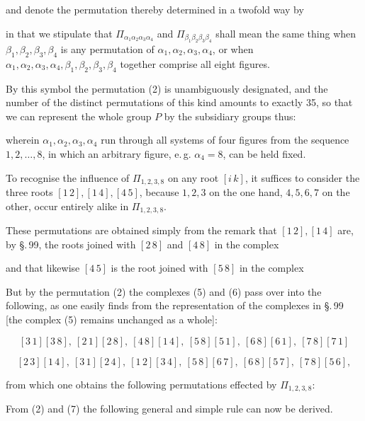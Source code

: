 and denote the permutation thereby determined in a twofold way by


in that we stipulate that $\Pi_{\alpha_1\alpha_2\alpha_3\alpha_4}$ and $\Pi_{\beta_1\beta_2\beta_3\beta_4}$ shall mean the same thing when $\beta_1,\beta_2,\beta_3,\beta_4$ is any permutation of $\alpha_1,\alpha_2,\alpha_3,\alpha_4$, or when $\alpha_1,\alpha_2,\alpha_3,\alpha_4,\beta_1,\beta_2,\beta_3,\beta_4$ together comprise all eight figures.

By this symbol the permutation (2) is unambiguously designated, and the number of the distinct permutations of this kind amounts to exactly 35, so that we can represent the whole group $P$ by the subsidiary groups thus:


wherein $\alpha_1,\alpha_2,\alpha_3,\alpha_4$ run through all systems of four figures from the sequence $1,2,\dots,8$, in which an arbitrary figure, e.\,g. $\alpha_4 = 8$, can be held fixed.

To recognise the influence of $\Pi_{1,2,3,8}$ on any root $[i\,k]$, it suffices to consider the three roots $[1\,2], [1\,4], [4\,5]$, because $1,2,3$ on the one hand, $4,5,6,7$ on the other, occur entirely alike in $\Pi_{1,2,3,8}$.

These permutations are obtained simply from the remark that $[1\,2], [1\,4]$ are, by \S.\,99, the roots joined with $[2\,8]$ and $[4\,8]$ in the complex


and that likewise $[4\,5]$ is the root joined with $[5\,8]$ in the complex


But by the permutation (2) the complexes (5) and (6) pass over into the following, as one easily finds from the representation of the complexes in \S.\,99 [the complex (5) remains unchanged as a whole]:

\[
[3\,1][3\,8],\ [2\,1][2\,8],\ [4\,8][1\,4],\ [5\,8][5\,1],\ [6\,8][6\,1],\ [7\,8][7\,1]
\]

\[
[2\,3][1\,4],\ [3\,1][2\,4],\ [1\,2][3\,4],\ [5\,8][6\,7],\ [6\,8][5\,7],\ [7\,8][5\,6],
\]

from which one obtains the following permutations effected by $\Pi_{1,2,3,8}$:


From (2) and (7) the following general and simple rule can now be derived.
